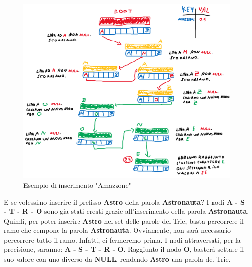 \documentclass[a4paper, 12pt]{article}
\begin{document}
\clearpage
\begin{figure}
    \centering
    \includegraphics[width=13cm]{Images/esempio inserimento.png}
    \caption{Esempio di inserimento "Amazzone"}
    \label{fig:insertexample}
\end{figure}

\clearpage

E se volessimo inserire il prefisso \textbf{Astro} della parola \textbf{Astronauta}? I nodi \textbf{A - S - T - R - O} sono gia stati creati grazie all'inserimento della parola \textbf{Astronauta}. Quindi, per poter inserire \textbf{Astro} nel set delle parole del Trie, basta percorrere il ramo che compone la parola \textbf{Astronauta}. Ovviamente, non sarà necessario percorrere tutto il ramo. Infatti, ci fermeremo prima. I nodi attraversati, per la precisione, saranno: \textbf{A - S - T - R - O}. Raggiunto il nodo \textbf{O}, basterà settare il suo valore con uno diverso da \textbf{NULL}, rendendo \textbf{Astro} una parola del Trie.
\end{document}
